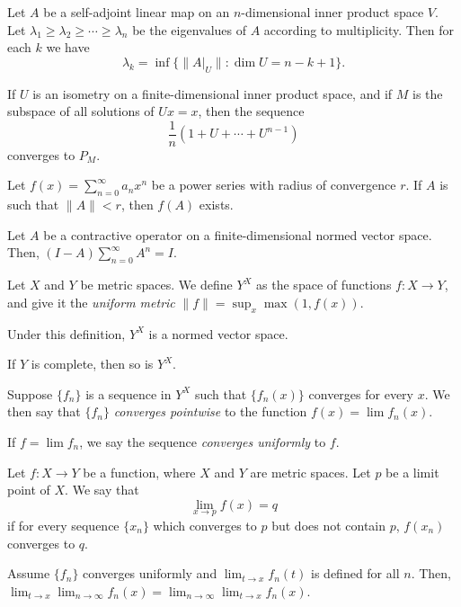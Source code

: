 \begin{prop}
  Let $A$ be a self-adjoint linear map on an $n$-dimensional inner product space
  $V$. Let $\lambda_1\ge\lambda_2\ge\cdots\ge\lambda_n$ be the eigenvalues of
  $A$ according to multiplicity. Then for each $k$ we have
  \[\lambda_k=\inf\{\|A|_U\|:\dim U=n-k+1\}.\]
\end{prop}
\begin{thm}
  If $U$ is an isometry on a finite-dimensional inner product space, and if $M$
  is the subspace of all solutions of $Ux=x$, then the sequence
  \[\frac1n(1+U+\cdots+U^{n-1})\] converges to $P_M$.
\end{thm}
\begin{prop}
  Let $f(x)=\sum_{n=0}^\infty a_n x^n$ be a power series with radius of
  convergence $r$. If $A$ is such that $\|A\|<r$, then $f(A)$ exists.
\end{prop}
\begin{prop}
  Let $A$ be a contractive operator on a finite-dimensional normed vector space. Then,
  $(I-A)\sum_{n=0}^\infty A^n=I$.
\end{prop}
\begin{defn}
    Let $X$ and $Y$ be metric spaces. We define $Y^X$ as the space of
    functions $f:X\to Y$, and give it the \emph{uniform metric}
    $\|f\|=\sup_x\max(1,f(x))$.
\end{defn}
\begin{prop}
    Under this definition, $Y^X$ is a normed vector space.
\end{prop}
\begin{prop}
    If $Y$ is complete, then so is $Y^X$.
\end{prop}
\begin{defn}
    Suppose $\{f_n\}$ is a sequence in $Y^X$ such that $\{f_n(x)\}$
    converges for every $x$. We then say that $\{f_n\}$ \emph{converges
    pointwise} to the function $f(x)=\lim f_n(x)$.

    If $f=\lim f_n$, we say the sequence \emph{converges uniformly} to $f$.
\end{defn}
\begin{defn}
  Let $f:X\to Y$ be a function, where $X$ and $Y$ are metric spaces.
  Let $p$ be a limit point of $X$. We say that
  \[\lim_{x\to p}f(x)=q\] if for every sequence $\{x_n\}$ which converges
  to $p$ but does not contain $p$, $f(x_n)$ converges to $q$.
\end{defn}
\begin{prop}
    Assume $\{f_n\}$ converges uniformly and $\lim_{t\to x}f_n(t)$ is defined for
    all $n$. Then, $\lim_{t\to x}\lim_{n\to\infty}
    f_n(x)=\lim_{n\to\infty}\lim_{t\to x}f_n(x)$.
\end{prop}
